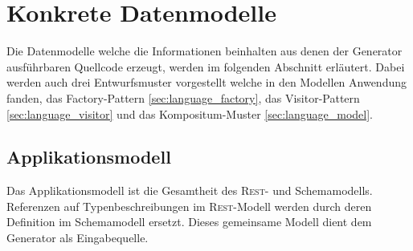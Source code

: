 \section{Konkrete Datenmodelle}
\label{sec:concrete_model}

Die Datenmodelle welche die Informationen beinhalten aus denen der Generator ausführbaren Quellcode erzeugt, werden im folgenden Abschnitt erläutert. Dabei werden auch drei Entwurfsmuster vorgestellt welche in den Modellen Anwendung fanden, das Factory-Pattern \cref{sec:language_factory}, das Visitor-Pattern \cref{sec:language_visitor} und das Kompositum-Muster \cref{sec:language_model}.





\subsection{Applikationsmodell}
\label{sec:application_model}

Das Applikationsmodell ist die Gesamtheit des \textsc{Rest}- und Schemamodells. Referenzen auf Typenbeschreibungen im \textsc{Rest}-Modell werden durch deren Definition im Schemamodell ersetzt. Dieses gemeinsame Modell dient dem Generator als Eingabequelle.

